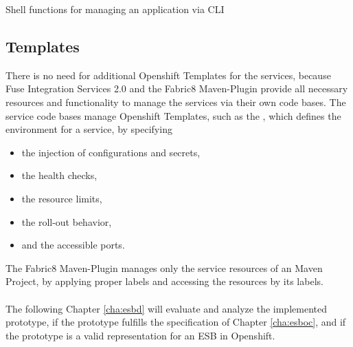 \begin{listing}[h]
	\caption{Shell functions for managing an application via CLI}
	\label{ls:esboi-openshift-oc-template}
\end{listing}

\subsection{Templates}
\label{sec:esbi-openshift-config}
There is no need for additional Openshift Templates for the services, because Fuse Integration Services 2.0 and the Fabric8 Maven-Plugin provide all necessary resources and functionality to manage the services via their own code bases. The service code bases manage Openshift Templates, such as the , which defines the environment for a service, by specifying
\begin{itemize}
	\item the injection of configurations and secrets,
	\item the health checks,
	\item the resource limits,
	\item the roll-out behavior,
	\item and the accessible ports.
\end{itemize}

The Fabric8 Maven-Plugin manages only the service resources of an Maven Project, by applying proper labels and accessing the resources by its labels.
\\ \\
The following Chapter \vref{cha:esbd} will evaluate and analyze the implemented prototype, if the prototype fulfills the specification of Chapter \vref{cha:esboc}, and if the prototype is a valid representation for an ESB in Openshift.


